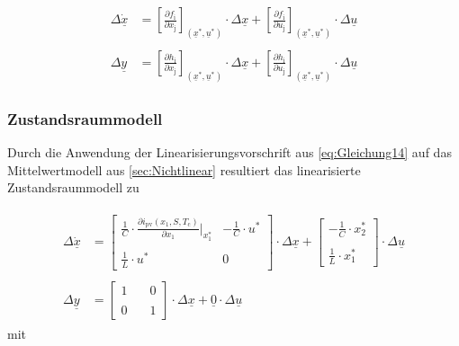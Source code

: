 \begin{align}
    \begin{split}
        \Delta\dot{\underline{x}} &= \left[\frac{\partial f_{\mathrm{i}}}{\partial x_{\mathrm{j}}}\right]_{(\underline{x}^{*}, \underline{u}^{*})}\cdot\Delta{\underline{x}}+\left[\frac{\partial f_{\mathrm{i}}}{\partial u_{\mathrm{j}}}\right]_{(\underline{x}^{*},\underline{u}^{*})}\cdot\Delta{\underline{u}}\\\\
        \Delta{\underline{y}} &= \left[\frac{\partial h_{\mathrm{i}}}{\partial x_{\mathrm{j}}}\right]_{(\underline{x}^{*}, \underline{u}^{*})}\cdot\Delta{\underline{x}}+\left[\frac{\partial h_{\mathrm{i}}}{\partial u_{\mathrm{j}}}\right]_{(\underline{x}^{*},\underline{u}^{*})}\cdot\Delta{\underline{u}}
    \end{split}
    \label{eq:Gleichung14}
\end{align}

\subsubsection{Zustandsraummodell} \label{sec:Zustandsraummodell}

Durch die Anwendung der Linearisierungsvorschrift aus \autoref{eq:Gleichung14} auf das Mittelwertmodell aus \autoref{sec:Nichtlinear} resultiert das linearisierte Zustandsraummodell zu

\begin{align}
    \begin{split}
    \Delta\underline{\dot{x}} &= 
    \begin{bmatrix}
        \frac{1}{C}\cdot\frac{\partial i_{\mathrm{pv}}(x_{\mathrm{1}}, S, T_{\mathrm{c}})}{\partial x_{\mathrm{1}}}\big |_{x_{\mathrm{1}}^*} & -\frac{1}{C}\cdot u^* \\\\
        \frac{1}{L}\cdot u^* & 0
    \end{bmatrix} \cdot \Delta \underline{x} +
    \begin{bmatrix}
        -\frac{1}{C}\cdot x_{\mathrm{2}}^* \\\\
        \frac{1}{L}\cdot x_{\mathrm{1}}^*
    \end{bmatrix} \cdot
    \Delta \underline{u}
     \\\\
    \Delta \underline{y} &= 
    \begin{bmatrix}
        1 & \quad 0 \\\\
        0 & \quad 1
    \end{bmatrix} \cdot \Delta \underline{x} + \underline{0} \cdot \Delta\underline{u}
    \end{split}
    \label{eq:Gleichung15}
\end{align}
\newline
mit

